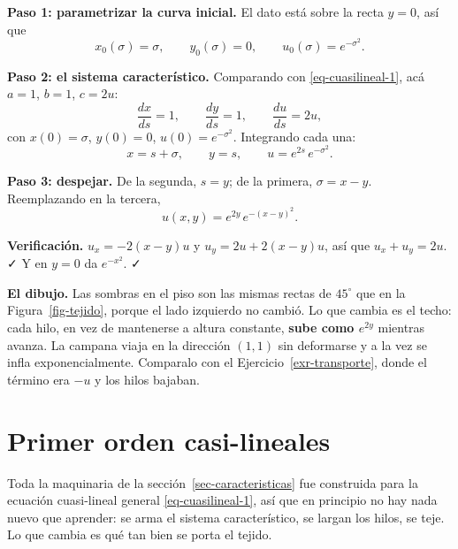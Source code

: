\documentclass[
  spanish,
  a4paper,
]{scrbook}
\theoremstyle{definition}
\theoremstyle{plain}
\theoremstyle{definition}
\theoremstyle{plain}
\theoremstyle{definition}
\theoremstyle{remark}
\begin{document}
\begin{tcolorbox}[enhanced jigsaw, arc=.35mm, bottomrule=.15mm, bottomtitle=1mm, breakable, colback=white, colbacktitle=quarto-callout-tip-color!10!white, colframe=quarto-callout-tip-color-frame, coltitle=black, left=2mm, leftrule=.75mm, opacityback=0, opacitybacktitle=0.6, rightrule=.15mm, title=\textcolor{quarto-callout-tip-color}{\faLightbulb}\hspace{0.5em}{Solución}, titlerule=0mm, toprule=.15mm, toptitle=1mm]

\textbf{Paso 1: parametrizar la curva inicial.} El dato está sobre la
recta \(y=0\), así que
\[x_0(\sigma) = \sigma, \qquad y_0(\sigma) = 0, \qquad u_0(\sigma) = e^{-\sigma^2}.\]

\textbf{Paso 2: el sistema característico.} Comparando con
\ref{eq-cuasilineal-1}, acá \(a=1\), \(b=1\), \(c=2u\):
\[\frac{dx}{ds} = 1, \qquad \frac{dy}{ds} = 1, \qquad \frac{du}{ds} = 2u,\]
con \(x(0)=\sigma\), \(y(0)=0\), \(u(0)=e^{-\sigma^2}\). Integrando cada
una: \[x = s + \sigma, \qquad y = s, \qquad u = e^{2s}\,e^{-\sigma^2}.\]

\textbf{Paso 3: despejar.} De la segunda, \(s = y\); de la primera,
\(\sigma = x - y\). Reemplazando en la tercera,
\[\boxed{\;u(x,y) = e^{2y}\,e^{-(x-y)^2}.\;}\]

\textbf{Verificación.} \(u_x = -2(x-y)u\) y \(u_y = 2u + 2(x-y)u\), así
que \(u_x + u_y = 2u\). ✓ Y en \(y=0\) da \(e^{-x^2}\). ✓

\textbf{El dibujo.} Las sombras en el piso son las mismas rectas de
\(45^\circ\) que en la Figura~\ref{fig-tejido}, porque el lado izquierdo
no cambió. Lo que cambia es el techo: cada hilo, en vez de mantenerse a
altura constante, \textbf{sube como \(e^{2y}\)} mientras avanza. La
campana viaja en la dirección \((1,1)\) sin deformarse y a la vez se
infla exponencialmente. Comparalo con el Ejercicio~\ref{exr-transporte},
donde el término era \(-u\) y los hilos bajaban.

\end{tcolorbox}

\section{Primer orden casi-lineales}\label{sec-casi-lineales}

Toda la maquinaria de la sección~\ref{sec-caracteristicas} fue
construida para la ecuación cuasi-lineal general \ref{eq-cuasilineal-1},
así que en principio no hay nada nuevo que aprender: se arma el sistema
característico, se largan los hilos, se teje. Lo que cambia es qué tan
bien se porta el tejido.
\end{document}
